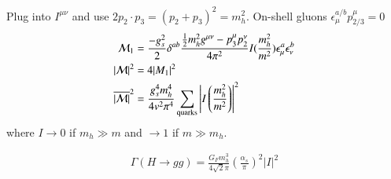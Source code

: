 Plug into $I^{\mu\nu}$ and use $2 p_2 \cdot p_3 = (p_2 + p_3)^2 = m_h^2$. On-shell gluons $\epsilon_\mu^{a/b} p_{2/3}^\mu = 0$
\begin{align}
   \mathcal{M}_1 &= \frac{-g_s^2}{2} \delta^{ab} \frac{\frac{1}{2} m_h^2 g^{\mu\nu} - p_3^\mu p_2^\nu }{4\pi^2} I(\frac{m_h^2}{m^2}) \epsilon^a_\mu \epsilon_\nu^b \\
   |\mathcal{M}|^2 &= 4 |M_1|^2 \\
   \overline{|\mathcal{M}|}^2 &= \frac{g_s^4 m_h^4}{4 v^2 \pi^4} \sum_{\text{quarks}} \left|I \left(\frac{m_h^2}{m^2} \right) \right|^2
\end{align}
where $I \rightarrow 0$ if $m_h \gg m$ and $\rightarrow 1$ if $m \gg m_h$.

\begin{align}
   \Gamma(H \rightarrow gg) = \frac{G_F m_h^3}{4\sqrt{2}\pi} \left( \frac{\alpha_s}{\pi}\right)^2 |I|^2 
\end{align}

